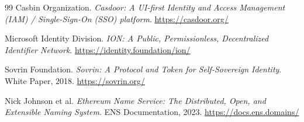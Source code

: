 \begin{thebibliography}{99}
Casbin Organization.
\textit{Casdoor: A UI-first Identity and Access Management (IAM) / Single-Sign-On (SSO) platform}.
\url{https://casdoor.org/}

Microsoft Identity Division.
\textit{ION: A Public, Permissionless, Decentralized Identifier Network}.
\url{https://identity.foundation/ion/}

Sovrin Foundation.
\textit{Sovrin: A Protocol and Token for Self-Sovereign Identity}.
White Paper, 2018.
\url{https://sovrin.org/}

Nick Johnson et al.
\textit{Ethereum Name Service: The Distributed, Open, and Extensible Naming System}.
ENS Documentation, 2023.
\url{https://docs.ens.domains/}

\end{thebibliography}

\appendix

